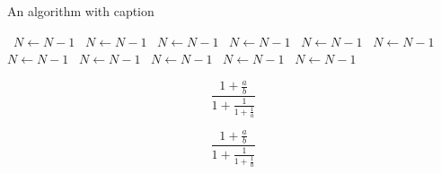 \documentclass[a4paper]{article}
\begin{document}
\begin{algorithm}
\caption{An algorithm with caption}
\begin{algorithmic}
\    \State $N \gets N - 1$
\    \State $N \gets N - 1$
\    \State $N \gets N - 1$
\    \State $N \gets N - 1$
\    \State $N \gets N - 1$
\    \State $N \gets N - 1$
\    \State $N \gets N - 1$
\    \State $N \gets N - 1$
\    \State $N \gets N - 1$
\    \State $N \gets N - 1$
\    \State $N \gets N - 1$
\EndWhile
\end{algorithmic}
\end{algorithm}

\[ \frac{1+\frac{a}{b}}{1+\frac{1}{1+\frac{1}{a}}} \]

\[ \frac{1+\frac{a}{b}}{1+\frac{1}{1+\frac{1}{a}}} \]
\end{document}
